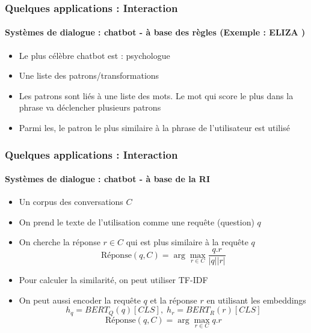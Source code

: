 \documentclass[xcolor=table]{beamer}
\begin{document}
\begin{frame}
	\frametitle{Quelques applications : Interaction}
	\framesubtitle{Systèmes de dialogue : chatbot - à base des règles (Exemple : ELIZA \cite{1966-Weizenbaum})}
	
	\begin{itemize}
		\item Le plus célèbre chatbot est  : psychologue
		\item Une liste des patrons/transformations 
		
		
		
		\item Les patrons sont liés à une liste des mots. Le mot qui score le plus dans la phrase va déclencher plusieurs patrons
		
		\item Parmi les, le patron le plus similaire à la phrase de l'utilisateur est utilisé
	\end{itemize}
	
\end{frame}

\begin{frame}
	\frametitle{Quelques applications : Interaction}
	\framesubtitle{Systèmes de dialogue : chatbot - à base de la RI}
	
	\begin{itemize}
		\item Un corpus des conversations $C$
		\item On prend le texte de l'utilisation comme une requête (question) $q$
		\item On cherche la réponse $r \in C$ qui est plus similaire à la requête $q$
		\[\text{Réponse}(q, C) = \arg\max_{r \in C} \frac{q . r}{|q| |r|}\]
		\item Pour calculer la similarité, on peut utiliser TF-IDF
		\item On peut aussi encoder la requête $q$ et la réponse $r$ en utilisant les embeddings
		\[h_q = BERT_Q(q)[CLS],\; h_r = BERT_R(r)[CLS]\]
		\[\text{Réponse}(q, C) = \arg\max_{r \in C} q . r\]
	\end{itemize}
\end{frame}
\end{document}
